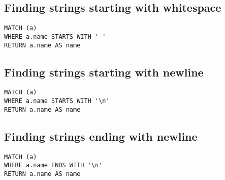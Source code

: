 \subsection{Finding strings starting with whitespace}

\begin{lstlisting}
MATCH (a)
WHERE a.name STARTS WITH ' '
RETURN a.name AS name
\end{lstlisting}

\subsection{Finding strings starting with newline}

\begin{lstlisting}
MATCH (a)
WHERE a.name STARTS WITH '\n'
RETURN a.name AS name
\end{lstlisting}

\subsection{Finding strings ending with newline}

\begin{lstlisting}
MATCH (a)
WHERE a.name ENDS WITH '\n'
RETURN a.name AS name
\end{lstlisting}

